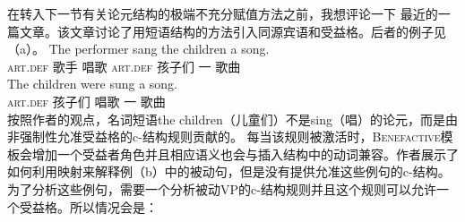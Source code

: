     在转入下一节有关论元结构的极端不充分赋值方法之前，我想评论一下 \citet*{AGT2014a}最近的一篇文章。该文章讨论了用短语结构的方法引入同源宾语和受益格。后者的例子见（a）。
\eal
\ex 
\gll The performer sang the children a song.\\
     \textsc{art}.\textsc{def} 歌手 唱歌 \textsc{art}.\textsc{def} 孩子们 一 歌曲\\
\ex 
\gll The children were sung a song.\\
     \textsc{art}.\textsc{def} 孩子们 \passivepst{} 唱歌 一 歌曲\\
\zl
按照作者的观点，名词短语the children（儿童们）不是sing（唱）的论元，而是由非强制性允准受益格的c-结构规则贡献的。
\ea\label{c-struc-vp-benefactive}
\z
每当该规则被激活时，\textsc{Benefactive}模板会增加一个受益者角色并且相应语义也会与插入结构中的动词兼容。作者展示了如何利用映射来解释例（b）中的被动句，但是没有提供允准这些例句的c-结构。为了分析这些例句，需要一个分析被动VP的c-结构规则并且这个规则可以允许一个受益格。所以情况会是：
